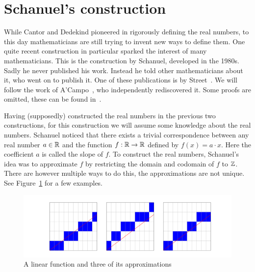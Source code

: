 \documentclass[../main.tex]{subfiles}
\begin{document}
\section{Schanuel's construction}\label{sec:the_real_numbers:schanuels_construction}
While Cantor and Dedekind pioneered in rigorously defining the real numbers, to this day mathematicians are still trying to invent new ways to define them. One quite recent construction in particular sparked the interest of many mathematicians. This is the construction by Schanuel, developed in the 1980s. Sadly he never published his work. Instead he told other mathematicians about it, who went on to publish it. One of these publications is by Street~\cite{Street1985}. We will follow the work of A'Campo~\cite{ACampo2003}, who independently rediscovered it. Some proofs are omitted, these can be found in~\cite{ACampo2003}.

Having (supposedly) constructed the real numbers in the previous two constructions, for this construction we will assume some knowledge about the real numbers. Schanuel noticed that there exists a trivial correspondence between any real number $a\in\mathbb{R}$ and the function $f:\mathbb{R}\to\mathbb{R}$ defined by $f(x)=a\cdot x$. Here the coefficient $a$ is called the slope of $f$. To construct the real numbers, Schanuel's idea was to approximate $f$ by restricting the domain and codomain of $f$ to $\mathbb{Z}$. There are however multiple ways to do this, the approximations are not unique. See Figure~\ref{fig:the_real_numbers:schanuel_function_approximation} for a few examples.

\begin{figure}[!htbp]
    \centering
    \includegraphics[width=\linewidth]{figures/schanuel_function_approximation}
    \caption{A linear function and three of its approximations}
    \label{fig:the_real_numbers:schanuel_function_approximation}
\end{figure}
\end{document}
